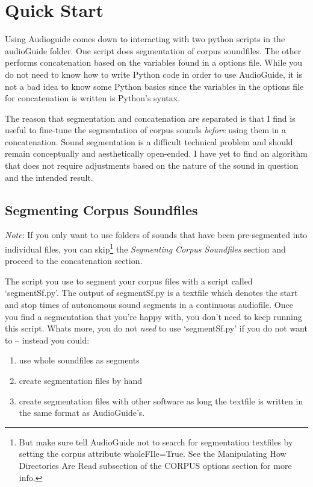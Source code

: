 \documentclass{article}
\begin{document}
\begin{spacing}{1.2}
\begin{description}
\end{description}

  


\section{Quick Start}
Using Audioguide comes down to interacting with two python scripts in the audioGuide folder.  One script does segmentation of corpus soundfiles.  The other performs concatenation based on the variables found in a options file.  While you do not need to know how to write Python code in order to use AudioGuide, it is not a bad idea to know some Python basics since the variables in the options file for concatenation is written is Python's syntax.

The reason that segmentation and concatenation are separated is that I find is useful to fine-tune the segmentation of corpus sounds \emph{before} using them in a concatenation.  Sound segmentation is a difficult technical problem and should remain conceptually and aesthetically open-ended.  I have yet to find an algorithm that does not require adjustments based on the nature of the sound in question and the intended result.  


\subsection{Segmenting Corpus Soundfiles}
\emph{Note}: If you only want to use folders of sounds that have been pre-segmented into individual files, you can skip\footnote{But make sure tell AudioGuide not to search for segmentation textfiles by setting the corpus attribute wholeFIle=True.  See the Manipulating How Directories Are Read subsection of the CORPUS options section for more info.} the \emph{Segmenting Corpus Soundfiles} section and proceed to the concatenation section.

The script you use to segment your corpus files with a script called `segmentSf.py'.  The output of segmentSf.py is a textfile which denotes the start and stop times of autonomous sound segments in a continuous audiofile.  Once you find a segmentation that you're happy with, you don't need to keep running this script.
Whats more, you do not \emph{need} to use `segmentSf.py' if you do not want to -- instead you could:
\begin{enumerate}
\item use whole soundfiles as segments
\item create segmentation files by hand
\item create segmentation files with other software as long the textfile is written in the same format as AudioGuide's.
\end{enumerate}


\end{spacing}
\end{document}

